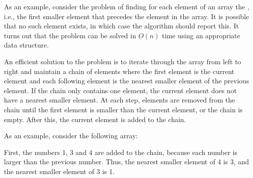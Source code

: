 As an example, consider the problem
of finding for each element
of an array the
, i.e.,
the first smaller element that precedes
the element in the array.
It is possible that no such element exists,
in which case the algorithm should report this.
It turns out that the problem can be solved
in $O(n)$ time using an appropriate data structure.

An efficient solution to the problem is to
iterate through the array from left to right
and maintain a chain of elements where the
first element is the current element
and each following element is the nearest smaller
element of the previous element.
If the chain only contains one element,
the current element does not have a nearest smaller element.
At each step, elements are removed from the chain
until the first element is smaller
than the current element, or the chain is empty.
After this, the current element is added to the chain.

As an example, consider the following array:
\begin{center}
\end{center}

First, the numbers 1, 3 and 4 are added to the chain,
because each number is larger than the previous number.
Thus, the nearest smaller element of 4 is 3,
and the nearest smaller element of 3 is 1.
\begin{center}
\end{center}

